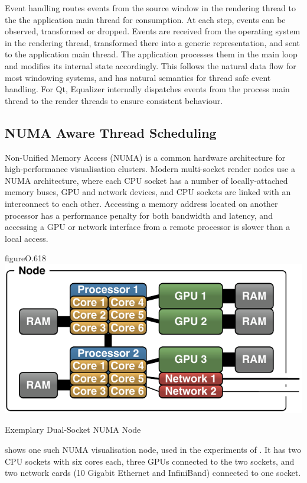 Event handling routes events from the source window in the rendering thread to
the the application main thread for consumption. At each step, events can be
observed, transformed or dropped. Events are received from the operating system
in the rendering thread, transformed there into a generic representation, and
sent to the application main thread. The application processes them in the main
loop and modifies its internal state accordingly. This follows the natural data
flow for most windowing systems, and has natural semantics for thread safe
event handling. For Qt, Equalizer internally dispatches events from the process
main thread to the render threads to ensure consistent behaviour.

\subsection{NUMA Aware Thread Scheduling}

Non-Unified Memory Access (NUMA) is a common hardware architecture for
high-performance visualisation clusters. Modern multi-socket render nodes use a
NUMA architecture, where each CPU socket has a number of locally-attached
memory buses, GPU and network devices, and CPU sockets are linked with an
interconnect to each other. Accessing a memory address located on another
processor has a performance penalty for both bandwidth and latency, and
accessing a GPU or network interface from a remote processor is slower than a
local access.

\begin{wrapfloat}{figure}{O}{.618\textwidth}
 \includegraphics[width=.618\textwidth]{images/numaNode.pdf}
 {\caption{\label{fNumaNode}Exemplary Dual-Socket NUMA Node}}
\end{wrapfloat}

 shows one such NUMA visualisation node, used in the experiments
of \cite{EBAHMP:12}. It has two CPU sockets with six cores each, three GPUs
connected to the two sockets, and two network cards (10 Gigabit Ethernet and
InfiniBand) connected to one socket.

